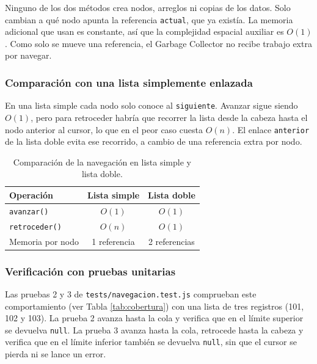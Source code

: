 Ninguno de los dos métodos crea nodos, arreglos ni copias de los datos. Solo
cambian a qué nodo apunta la referencia \texttt{actual}, que ya existía. La
memoria adicional que usan es constante, así que la complejidad espacial
auxiliar es $O(1)$. Como solo se mueve una referencia, el Garbage Collector no
recibe trabajo extra por navegar.

\subsubsection*{Comparación con una lista simplemente enlazada}

En una lista simple cada nodo solo conoce al \texttt{siguiente}. Avanzar sigue
siendo $O(1)$, pero para retroceder habría que recorrer la lista desde la
cabeza hasta el nodo anterior al cursor, lo que en el peor caso cuesta $O(n)$.
El enlace \texttt{anterior} de la lista doble evita ese recorrido, a cambio de
una referencia extra por nodo.

\begin{table}[H]
    \centering\small
    \begin{tabular}{@{}lcc@{}}
    \toprule
        \textbf{Operación} & \textbf{Lista simple} & \textbf{Lista doble} \\
    \midrule
        \texttt{avanzar()}    & $O(1)$ & $O(1)$ \\
        \texttt{retroceder()} & $O(n)$ & $O(1)$ \\
        Memoria por nodo      & 1 referencia & 2 referencias \\
    \bottomrule
    \end{tabular}
    \caption{Comparación de la navegación en lista simple y lista doble.}
    \label{tab:navegacion}
\end{table}

\subsubsection*{Verificación con pruebas unitarias}

Las pruebas 2 y 3 de \texttt{tests/navegacion.test.js} comprueban este
comportamiento (ver Tabla \ref{tab:cobertura}) con una lista de tres registros (101, 102 y 103). La prueba 2
avanza hasta la cola y verifica que en el límite superior se devuelva
\texttt{null}. La prueba 3 avanza hasta la cola, retrocede hasta la cabeza y
verifica que en el límite inferior también se devuelva \texttt{null}, sin que
el cursor se pierda ni se lance un error.
